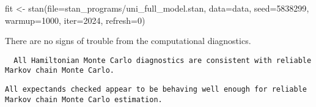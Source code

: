 \documentclass[
  letterpaper,
  DIV=11,
  numbers=noendperiod]{scrartcl}
\newenvironment{Shaded}{\begin{snugshade}}{\end{snugshade}}
\newcommand{\AttributeTok}[1]{\textcolor[rgb]{0.40,0.45,0.13}{#1}}
\newcommand{\DecValTok}[1]{\textcolor[rgb]{0.68,0.00,0.00}{#1}}
\newcommand{\FunctionTok}[1]{\textcolor[rgb]{0.28,0.35,0.67}{#1}}
\newcommand{\NormalTok}[1]{\textcolor[rgb]{0.00,0.23,0.31}{#1}}
\newcommand{\OtherTok}[1]{\textcolor[rgb]{0.00,0.23,0.31}{#1}}
\newcommand{\SpecialCharTok}[1]{\textcolor[rgb]{0.37,0.37,0.37}{#1}}
\newcommand{\StringTok}[1]{\textcolor[rgb]{0.13,0.47,0.30}{#1}}
\begin{document}
\begin{Shaded}
\begin{Highlighting}[]
\NormalTok{fit }\OtherTok{\textless{}{-}} \FunctionTok{stan}\NormalTok{(}\AttributeTok{file=}\StringTok{\textquotesingle{}stan\_programs/uni\_full\_model.stan\textquotesingle{}}\NormalTok{,}
            \AttributeTok{data=}\NormalTok{data, }\AttributeTok{seed=}\DecValTok{5838299}\NormalTok{,}
            \AttributeTok{warmup=}\DecValTok{1000}\NormalTok{, }\AttributeTok{iter=}\DecValTok{2024}\NormalTok{, }\AttributeTok{refresh=}\DecValTok{0}\NormalTok{)}
\end{Highlighting}
\end{Shaded}

There are no signs of trouble from the computational diagnostics.

\begin{Shaded}
\end{Shaded}

\begin{verbatim}
  All Hamiltonian Monte Carlo diagnostics are consistent with reliable
Markov chain Monte Carlo.
\end{verbatim}

\begin{Shaded}
\end{Shaded}

\begin{verbatim}
All expectands checked appear to be behaving well enough for reliable
Markov chain Monte Carlo estimation.
\end{verbatim}
\end{document}
